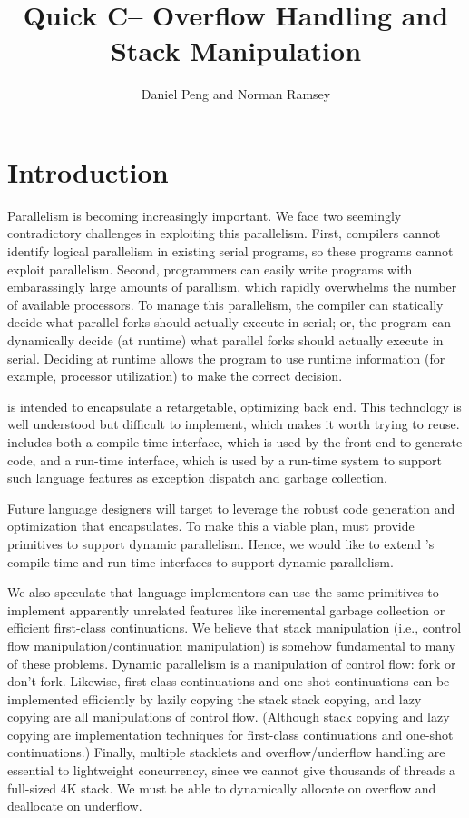 \documentclass[twoside,12pt]{article}
\author{Daniel Peng and Norman Ramsey}
\title{Quick C-- Overflow Handling and Stack Manipulation}
\begin{document}
\maketitle

\ifhtml\else\tableofcontents\fi

\section{Introduction}

Parallelism is becoming increasingly important.  We face two seemingly contradictory challenges in exploiting this parallelism.  First, compilers cannot identify logical parallelism in existing serial programs, so these programs cannot exploit parallelism.  Second, programmers can easily write programs with embarassingly large amounts of parallism, which rapidly overwhelms the number of available processors.  To manage this parallelism, the compiler can statically decide what parallel forks should actually execute in serial; or, the program can dynamically decide (at runtime) what parallel forks should actually execute in serial.  Deciding at runtime allows the program to use runtime information (for example, processor utilization) to make the correct decision.

{\PAL} is intended to encapsulate a retargetable, optimizing back end.  This technology is well understood but difficult to implement, which makes it worth trying to reuse.  {\PAL} includes both a compile-time interface, which is used by the front end to generate code, and a run-time interface, which is used by a run-time system to support such language features as exception dispatch and garbage collection.

Future language designers will target {\PAL} to leverage the robust code generation and optimization that {\PAL} encapsulates.  To make this a viable plan, {\PAL} must provide primitives to support dynamic parallelism.  Hence, we would like to extend {\PAL}'s compile-time and run-time interfaces to support dynamic parallelism.

We also speculate that language implementors can use the same primitives to implement apparently unrelated features like incremental garbage collection or efficient first-class continuations.  We believe that stack manipulation (i.e., control flow manipulation/continuation manipulation) is somehow fundamental to many of these problems.  Dynamic parallelism is a manipulation of control flow: fork or don't fork.  Likewise, first-class continuations and one-shot continuations can be implemented efficiently by lazily copying the stack stack copying, and lazy copying are all manipulations of control flow.  (Although stack copying and lazy copying are implementation techniques for first-class continuations and one-shot continuations.)  Finally, multiple stacklets and overflow/underflow handling are essential to lightweight concurrency, since we cannot give thousands of threads a full-sized 4K stack.  We must be able to dynamically allocate on overflow and deallocate on underflow.
\end{document}
